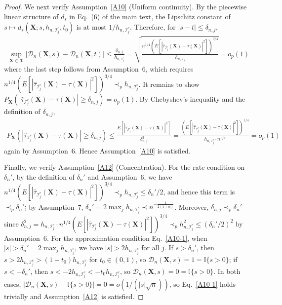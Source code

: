 \documentclass[11pt]{article}
\theoremstyle{referenceplain}
\theoremstyle{referencedefinition}
\theoremstyle{referenceremark}
\begin{document}
\begin{proof}
    We next verify Assumption~\ref{A10} (Uniform continuity). 
    By the piecewise linear structure of $d_s$ in Eq.~(6) 
    of the main text, the Lipschitz constant of 
    $s\mapsto d_s(\mathbf{X};s,h_{n,\mathcal{I}_j^c},t_0)$ 
    is at most $1/h_{n,\mathcal{I}_j^c}$. Therefore, for 
    $|s-t|\leq {\delta_{n,j}}$,
    \begin{align*}
        \sup_{\mathbf{X}\in\mathcal{X}}
        |\mathcal{D}_n(\mathbf{X},s)-\mathcal{D}_n(\mathbf{X},t)|
        \leq \frac{{\delta_{n,j}}}{h_{n,\mathcal{I}_j^c}}
        =\sqrt{\frac{n^{1/4}
        \left(E[|\widehat{\tau}_{\mathcal{I}_j^c}(\mathbf{X})
        -\tau(\mathbf{X})|^2]\right)^{3/4}}
        {h_{n,\mathcal{I}_j^c}}}
        =o_p(1)
    \end{align*}
    where the last step follows from Assumption~6, which 
    requires $n^{1/4}(E[|\widehat{\tau}_{{\mathcal{I}_j^c}}
    (\mathbf{X})-\tau(\mathbf{X})|^2])^{3/4}
    \prec_p h_{n,{\mathcal{I}_j^c}}$. It remains to show 
    $P_{\mathbf{X}}(|\widehat{\tau}_{\mathcal{I}_j^c}
    (\mathbf{X})-\tau(\mathbf{X})|\ge {\delta_{n,j}})=o_p(1)$. 
    By Chebyshev's inequality and the definition of ${\delta_{n,j}}$,
    \begin{align*}
        P_{\mathbf{X}}\!\left(|\widehat{\tau}_{\mathcal{I}_j^c}
        (\mathbf{X})-\tau(\mathbf{X})|\ge {\delta_{n,j}}\right)
        \leq \frac{E[|\widehat{\tau}_{\mathcal{I}_j^c}
        (\mathbf{X})-\tau(\mathbf{X})|^2]}{{\delta_{n,j}^2}}
        =\frac{(E[|\widehat{\tau}_{\mathcal{I}_j^c}(\mathbf{X})
        -\tau(\mathbf{X})|^2])^{1/4}}
        {h_{n,\mathcal{I}_j^c}\cdot n^{1/4}}
        =o_p(1)
    \end{align*}
    again by Assumption~6. Hence Assumption~\ref{A10} 
    is satisfied.

    Finally, we verify Assumption~\ref{A12} (Concentration). 
    For the rate condition on $\delta_n'$, by the definition 
    of $\delta_n'$ and Assumption~6, we have 
    $n^{1/4}(E[|\widehat{\tau}_{{\mathcal{I}_j^c}}(\mathbf{X})
    -\tau(\mathbf{X})|^2])^{3/4}\prec_p h_{n,{\mathcal{I}_j^c}}
    \leq \delta_n'/2$, {and hence this term is $\prec_p\delta_n'$;} by Assumption~7, 
    $\delta_n'=2\max_j h_{n,\mathcal{I}_j^c}
    \prec n^{-\frac{1}{2(1+\alpha)}}$. Moreover, 
    ${\delta_{n,j}\prec_p\delta_n'}$ since 
    ${\delta_{n,j}^2}=h_{n,\mathcal{I}_j^c}\cdot n^{1/4}
    (E[|\widehat{\tau}_{\mathcal{I}_j^c}(\mathbf{X})
    -\tau(\mathbf{X})|^2])^{3/4}
    \prec_p h_{n,\mathcal{I}_j^c}^2
    \leq (\delta_n'/2)^2$ by Assumption~6. 
    For the approximation condition Eq.~\eqref{A10-1}, 
    when $|s|>\delta_n'=2\max_j h_{n,\mathcal{I}_j^c}$, 
    we have $|s|>2 h_{n,\mathcal{I}_j^c}$ for all $j$. 
    If $s>\delta_n'$, then 
    $s>2h_{n,\mathcal{I}_j^c}>(1-t_0)h_{n,\mathcal{I}_j^c}$ 
    for $t_0\in(0,1)$, so $\mathcal{D}_n(\mathbf{X},s)=1
    =\mathbb{I}\{s>0\}$; if $s<-\delta_n'$, then 
    $s<-2h_{n,\mathcal{I}_j^c}<-t_0 h_{n,\mathcal{I}_j^c}$, 
    so $\mathcal{D}_n(\mathbf{X},s)=0=\mathbb{I}\{s>0\}$. 
    In both cases, $|\mathcal{D}_n(\mathbf{X},s)
    -\mathbb{I}\{s>0\}|=0=o(1/({|s|}\sqrt{n}))$, so 
    Eq.~\eqref{A10-1} holds trivially and 
    Assumption~\ref{A12} is satisfied.


\end{proof}
\end{document}
